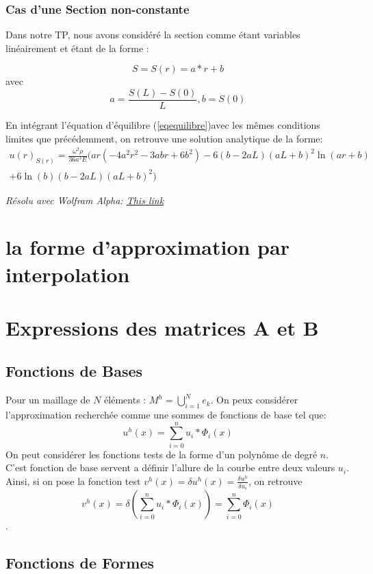 \documentclass[a4paper,10pt]{report} %
\begin{document}
\subsubsection{Cas d'une Section non-constante}

Dans notre TP, nous avons considéré la section comme étant variables linéairement et étant de la forme :

$$S=S(r)=a*r+b$$
avec
$$a=\frac{S(L)-S(0)}{L},b=S(0)$$ 

En intégrant l'équation d'équilibre (\ref{eqequilibre})avec les mêmes conditions limites que précédemment, on retrouve une solution analytique de la forme:
\begin{multline}
	u(r)_{S(r)}=\frac{\omega^2 \rho}{36a^3E}\Big( ar(-4a^2r^2-3abr+6b^2)-6(b-2aL)(aL+b)^2\ln(ar+b)\\+6\ln(b)(b-2aL)(aL+b)^2 \Big)
	\label{solution u}
\end{multline}

\textit{Résolu avec Wolfram Alpha\textregistered : \href{https://goo.gl/IB3dHC}{This link}}

\section{la forme d'approximation par interpolation}
\section{Expressions des matrices A et B }
\subsection{Fonctions de Bases}
Pour un maillage de $N$ éléments : $M^h=\bigcup_{i=1}^{N} e_k$. On peux considérer l'approximation recherchée comme une sommes de fonctions de base tel que:
\begin{equation}
	u^h(x)=\sum_{i=0}^n u_{i}*\Phi_{i}(x)
	\label{discretisation de u}
\end{equation}
On peut considérer les fonctions tests de la forme d'un polynôme de degré $n$. C'est fonction de base servent a définir l'allure de la courbe entre deux valeurs $u_{i}$.
Ainsi, si on pose la fonction test $v^h(x)=\delta u^h(x)=\frac{\delta u^h}{\delta u_i}$, on retrouve
$$v^h(x)=\delta (\sum_{i=0}^n u_{i}*\Phi_{i}(x))=\sum_{i=0}^n \Phi_{i}(x)$$.

\subsection{Fonctions de Formes}
\end{document}

